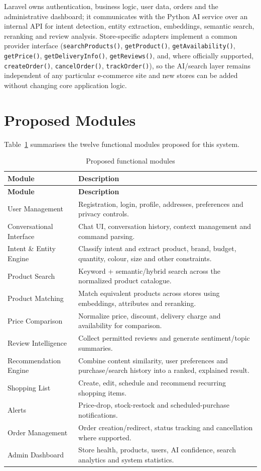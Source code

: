 \documentclass[12pt,a4paper]{article}
\begin{document}
Laravel owns authentication, business logic, user data, orders and the administrative dashboard; it communicates
with the Python AI service over an internal API for intent detection, entity extraction, embeddings, semantic
search, reranking and review analysis. Store-specific adapters implement a common provider interface
(\texttt{searchProducts()}, \texttt{getProduct()}, \texttt{getAvailability()}, \texttt{getPrice()},
\texttt{getDeliveryInfo()}, \texttt{getReviews()}, and, where officially supported, \texttt{createOrder()},
\texttt{cancelOrder()}, \texttt{trackOrder()}), so the AI/search layer remains independent of any particular
e-commerce site and new stores can be added without changing core application logic.

\section{Proposed Modules}

Table~\ref{tab:modules} summarises the twelve functional modules proposed for this system.

\begin{longtable}{p{3.6cm}p{9.8cm}}
\caption{Proposed functional modules} \label{tab:modules} \\
\toprule
\textbf{Module} & \textbf{Description} \\
\midrule
\endfirsthead
\toprule
\textbf{Module} & \textbf{Description} \\
\midrule
\endhead
User Management & Registration, login, profile, addresses, preferences and privacy controls. \\
Conversational Interface & Chat UI, conversation history, context management and command parsing. \\
Intent \& Entity Engine & Classify intent and extract product, brand, budget, quantity, colour, size and other constraints. \\
Product Search & Keyword + semantic/hybrid search across the normalized product catalogue. \\
Product Matching & Match equivalent products across stores using embeddings, attributes and reranking. \\
Price Comparison & Normalize price, discount, delivery charge and availability for comparison. \\
Review Intelligence & Collect permitted reviews and generate sentiment/topic summaries. \\
Recommendation Engine & Combine content similarity, user preferences and purchase/search history into a ranked, explained result. \\
Shopping List & Create, edit, schedule and recommend recurring shopping items. \\
Alerts & Price-drop, stock-restock and scheduled-purchase notifications. \\
Order Management & Order creation/redirect, status tracking and cancellation where supported. \\
Admin Dashboard & Store health, products, users, AI confidence, search analytics and system statistics. \\
\bottomrule
\end{longtable}
\end{document}
